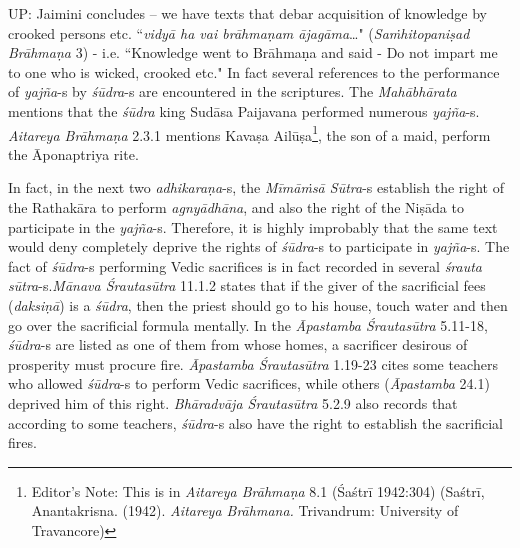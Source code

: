 UP: Jaimini concludes – we have texts that debar acquisition of knowledge by crooked persons etc. ``\textit{vidyā ha vai brāhmaṇam ājagāma}…" (\textit{Saṁhitopaniṣad Brāhmaṇa} 3) - i.e. ``Knowledge went to Brāhmaṇa and said - Do not impart me to one who is wicked, crooked etc." In fact several references to the performance of \textit{yajña}-s by \textit{śūdra}-s are encountered in the scriptures. The \textit{Mahābhārata} mentions that the \textit{śūdra} king Sudāsa Paijavana performed numerous \textit{yajña}-s. \textit{Aitareya Brāhmaṇa} 2.3.1 mentions Kavaṣa Ailūṣa\footnote{Editor's Note: This is in \textit{Aitareya Brāhmaṇa} 8.1 (Śaśtrī 1942:304) (Saśtrī, Anantakrisna. (1942). \textit{Aitareya Brāhmana.} Trivandrum: University of Travancore)}, the son of a maid, perform the Āponaptriya rite.

In fact, in the next two \textit{adhikaraṇa}-s, the \textit{Mīmāṁsā Sūtra}-s establish the right of the Rathakāra to perform \textit{agnyādhāna}, and also the right of the Niṣāda to participate in the \textit{yajña}-s. Therefore, it is highly improbably that the same text would deny completely deprive the rights of \textit{śūdra}-s to participate in \textit{yajña}-s. The fact of \textit{śūdra}-s performing Vedic sacrifices is in fact recorded in several \textit{śrauta sūtra}-s.\break \textit{Mānava Śrautasūtra} 11.1.2 states that if the giver of the sacrificial fees (\textit{daksiṇā}) is a \textit{śūdra}, then the priest should go to his house, touch water and then go over the sacrificial formula mentally. In the \textit{Āpastamba Śrautasūtra} 5.11-18, \textit{śūdra}-s are listed as one of them from whose homes, a sacrificer desirous of prosperity must procure fire. \textit{Āpastamba Śrautasūtra} 1.19-23 cites some teachers who allowed \textit{śūdra}-s to perform Vedic sacrifices, while others (\textit{Āpastamba} 24.1) deprived him of this right. \textit{Bhāradvāja Śrautasūtra} 5.2.9 also records that according to some teachers, \textit{śūdra}-s also have the right to establish the sacrificial fires.


